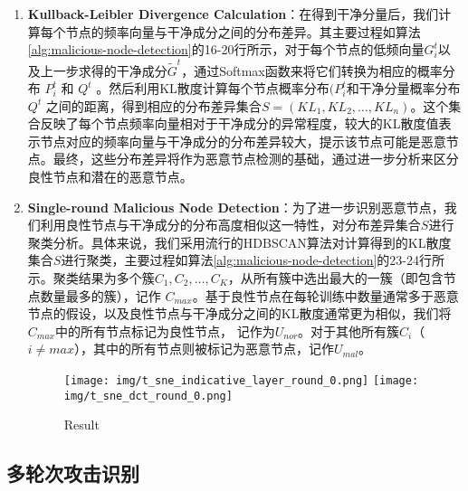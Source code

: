 \documentclass[lettersize,journal]{IEEEtran}
\begin{document}
\begin{enumerate}
\item \textbf{Kullback-Leibler Divergence Calculation}：在得到干净分量后，我们计算每个节点的频率向量与干净成分之间的分布差异。其主要过程如算法\ref{alg:malicious-node-detection}的16-20行所示，对于每个节点的低频向量\(G_i^t\)以及上一步求得的干净成分\(\tilde{G}^t\)，通过Softmax函数来将它们转换为相应的概率分布 \(P_i^t\) 和 \(Q^t\) 。然后利用KL散度计算每个节点概率分布\((P_i^t\)和干净分量概率分布 \(Q^t\) 之间的距离，得到相应的分布差异集合\(S = ({{KL}}_1, {{KL}}_2, \ldots, {{KL}}_n)\)。这个集合反映了每个节点频率向量相对于干净成分的异常程度，较大的KL散度值表示节点对应的频率向量与干净成分的分布差异较大，提示该节点可能是恶意节点。最终，这些分布差异将作为恶意节点检测的基础，通过进一步分析来区分良性节点和潜在的恶意节点。





\item \textbf{Single-round Malicious Node Detection}：为了进一步识别恶意节点，我们利用良性节点与干净成分的分布高度相似这一特性，对分布差异集合$S$进行聚类分析。具体来说，我们采用流行的HDBSCAN算法对计算得到的KL散度集合$S$进行聚类，主要过程如算法\ref{alg:malicious-node-detection}的23-24行所示。聚类结果为多个簇\(C_1, C_2, \ldots, C_K\)，从所有簇中选出最大的一簇（即包含节点数量最多的簇），记作 \(C_{max}\)。基于良性节点在每轮训练中数量通常多于恶意节点的假设，以及良性节点与干净成分之间的KL散度通常更为相似，我们将 \(C_{max}\)中的所有节点标记为良性节点， 记作为\(U_{nor}\)。对于其他所有簇\(C_i\)（\(i \neq {max}\)），其中的所有节点则被标记为恶意节点，记作\(U_{mal}\)。  


\begin{figure}[htbp]
    \centering
    \texttt{[image: img/t\_sne\_indicative\_layer\_round\_0.png]}
    \hspace{0.1in}
    \texttt{[image: img/t\_sne\_dct\_round\_0.png]}
    \caption{Result}
\end{figure}


\end{enumerate}

\subsection{多轮次攻击识别}
\end{document}
